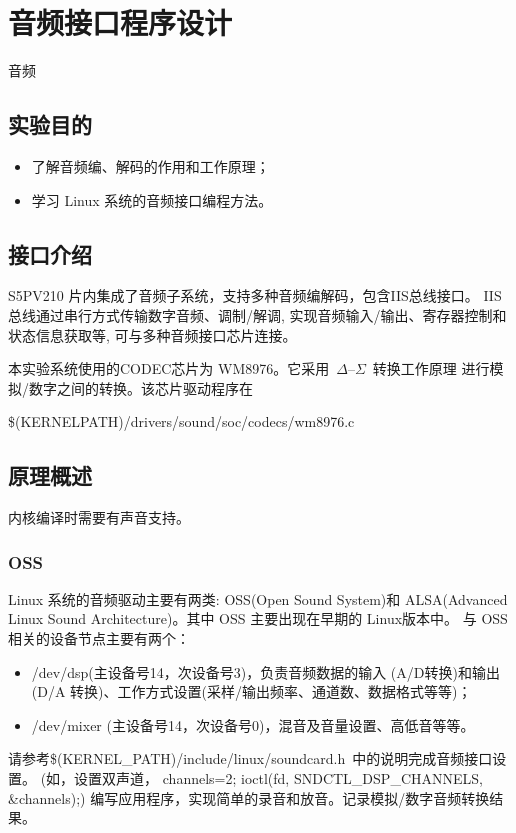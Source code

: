 \chapter{音频接口程序设计}{音频}

\section{实验目的}
\begin{itemize}
  \item 了解音频编、解码的作用和工作原理；
  \item 学习 Linux 系统的音频接口编程方法。
\end{itemize}

\section{接口介绍}
	S5PV210 片内集成了音频子系统，支持多种音频编解码，包含IIS总线接口。
IIS总线通过串行方式传输数字音频、调制/解调, 实现音频输入/输出、寄存器控制和
状态信息获取等, 可与多种音频接口芯片连接。

	本实验系统使用的CODEC芯片为 WM8976。它采用~$\Delta$--$\Sigma$~转换工作原理
进行模拟/数字之间的转换。该芯片驱动程序在

  \$(KERNELPATH)/drivers/sound/soc/codecs/wm8976.c

\section{原理概述}
	内核编译时需要有声音支持。

\subsection{OSS}
	Linux 系统的音频驱动主要有两类: OSS(Open Sound System)和 ALSA(Advanced
Linux Sound Architecture)。其中 OSS 主要出现在早期的 Linux版本中。
与 OSS 相关的设备节点主要有两个：

\begin{itemize}
  \item /dev/dsp(主设备号14，次设备号3)，负责音频数据的输入 (A/D转换)和输出
		(D/A 转换)、工作方式设置(采样/输出频率、通道数、数据格式等等)；
  \item /dev/mixer (主设备号14，次设备号0)，混音及音量设置、高低音等等。
\end{itemize}

	请参考\$(KERNEL\_PATH)/include/linux/soundcard.h~中的说明完成音频接口设置。
(如，设置双声道， channels=2; ioctl(fd, SNDCTL\_DSP\_CHANNELS, \&channels);)
编写应用程序，实现简单的录音和放音。记录模拟/数字音频转换结果。

